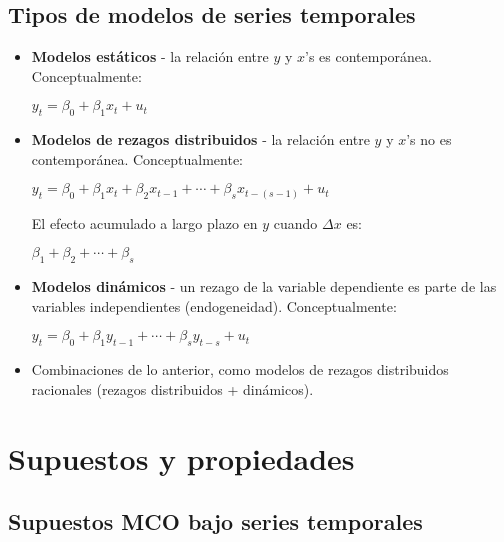 \documentclass[10pt, a4paper, landscape]{article}
\begin{document}
\begin{multicols}{3}
		\subsection*{Tipos de modelos de series temporales}
		
		\begin{itemize}[leftmargin=*]
			\item \textbf{Modelos estáticos} - la relación entre $y$ y $x$'s es contemporánea. Conceptualmente:
			
			\begin{center}
				$y_{t} = \beta_{0} + \beta_{1} x_{t} + u_{t}$
			\end{center}
			
			\item \textbf{Modelos de rezagos distribuidos} - la relación entre $y$ y $x$'s no es contemporánea. Conceptualmente:
			
			\begin{center}
				$y_{t} = \beta_{0} + \beta_{1} x_{t} + \beta_{2} x_{t - 1} + \cdots + \beta_{s} x_{t - (s - 1)} + u_{t}$
			\end{center}
			
			El efecto acumulado a largo plazo en $y$ cuando $\Delta x$ es:
			
			\begin{center}
				$\beta_{1} + \beta_{2} + \cdots + \beta_{s}$
			\end{center}
			
			\item \textbf{Modelos dinámicos} - un rezago de la variable dependiente es parte de las variables independientes (endogeneidad). Conceptualmente:
			
			\begin{center}
				$y_{t} = \beta_{0} + \beta_{1} y_{t - 1} + \cdots + \beta_{s} y_{t - s} + u_{t}$
			\end{center}
			
			\item Combinaciones de lo anterior, como modelos de rezagos distribuidos racionales (rezagos distribuidos + dinámicos).
		\end{itemize}
		
		\columnbreak
		
		\section*{Supuestos y propiedades}
		
		\subsection*{Supuestos MCO bajo series temporales}
		

\end{multicols}
\end{document}
